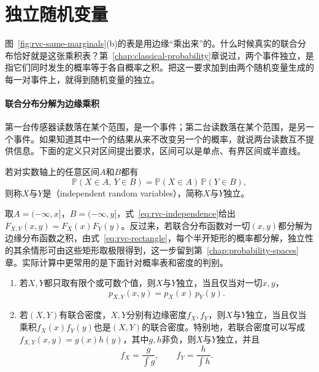 \section{独立随机变量}
\label{sec:rvc-independence}

图~\ref{fig:rvc-same-marginals}(b)的表是用边缘“乘出来”的。什么时候真实的联合分布恰好就是这张乘积表？第~\ref{chap:classical-probability}章说过，两个事件独立，是指它们同时发生的概率等于各自概率之积。把这一要求加到由两个随机变量生成的每一对事件上，就得到随机变量的独立。

\paragraph{联合分布分解为边缘乘积}
第一台传感器读数落在某个范围，是一个事件；第二台读数落在某个范围，是另一个事件。如果知道其中一个的结果从来不改变另一个的概率，就说两台读数互不提供信息。下面的定义只对区间提出要求，区间可以是单点、有界区间或半直线。

\begin{definition}[独立随机变量]
\label{def:rvc-independence}
若对实数轴上的任意区间$A$和$B$都有
\begin{equation}
 \mathbb{P}(X\in A,\,Y\in B)=\mathbb{P}(X\in A)\,\mathbb{P}(Y\in B),
 \label{eq:rvc-independence}
\end{equation}
则称$X$与$Y$是（independent random variables），简称$X$与$Y$独立。
\end{definition}

取$A=(-\infty,x]$，$B=(-\infty,y]$，式~\eqref{eq:rvc-independence}给出$F_{X,Y}(x,y)=F_X(x)F_Y(y)$。反过来，若联合分布函数对一切$(x,y)$都分解为边缘分布函数之积，由式~\eqref{eq:rvc-rectangle}，每个半开矩形的概率都分解，独立性的其余情形可由这些矩形取极限得到，这一步留到第~\ref{chap:probability-spaces}章。实际计算中更常用的是下面针对概率表和密度的判别。

\begin{theorem}[独立性的判别]
\label{thm:rvc-independence-criterion}
\begin{enumerate}
 \item 若$X,Y$都只取有限个或可数个值，则$X$与$Y$独立，当且仅当对一切$x,y$，
 \begin{equation}
 p_{X,Y}(x,y)=p_X(x)\,p_Y(y).
 \label{eq:rvc-independence-pmf}
 \end{equation}
 \item 若$(X,Y)$有联合密度，$X,Y$分别有边缘密度$f_X,f_Y$，则$X$与$Y$独立，当且仅当乘积$f_X(x)f_Y(y)$也是$(X,Y)$的联合密度。特别地，若联合密度可以写成$f_{X,Y}(x,y)=g(x)h(y)$，其中$g,h$非负，则$X$与$Y$独立，并且
 \begin{equation}
 f_X=\frac{g}{\int g},\qquad f_Y=\frac{h}{\int h}.
 \label{eq:rvc-factorization}
 \end{equation}
\end{enumerate}
\end{theorem}

